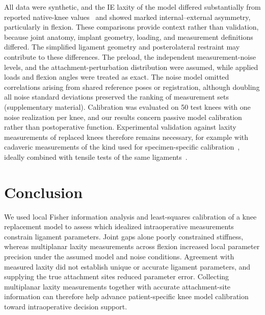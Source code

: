 All data were synthetic, and the IE laxity of the model differed substantially from reported native-knee values~\autocite{roth2015native} and showed marked internal--external asymmetry, particularly in flexion.
These comparisons provide context rather than validation, because joint anatomy, implant geometry, loading, and measurement definitions differed.
The simplified ligament geometry and posterolateral restraint may contribute to these differences.
The preload, the independent measurement-noise levels, and the attachment-perturbation distribution were assumed, while applied loads and flexion angles were treated as exact.
The noise model omitted correlations arising from shared reference poses or registration, although doubling all noise standard deviations preserved the ranking of measurement sets (supplementary material).
Calibration was evaluated on 50 test knees with one noise realization per knee, and our results concern passive model calibration rather than postoperative function.
Experimental validation against laxity measurements of replaced knees therefore remains necessary, for example with cadaveric measurements of the kind used for specimen-specific calibration~\autocite{harris2016combined,ewing2016estimating}, ideally combined with tensile tests of the same ligaments~\autocite{butler1986comparison}.

\section{Conclusion}

We used local Fisher information analysis and least-squares calibration of a knee replacement model to assess which idealized intraoperative measurements constrain ligament parameters.
Joint gaps alone poorly constrained stiffness, whereas multiplanar laxity measurements across flexion increased local parameter precision under the assumed model and noise conditions.
Agreement with measured laxity did not establish unique or accurate ligament parameters, and supplying the true attachment sites reduced parameter error.
Collecting multiplanar laxity measurements together with accurate attachment-site information can therefore help advance patient-specific knee model calibration toward intraoperative decision support.
